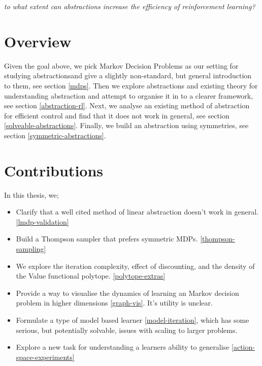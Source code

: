 \begin{displayquote}
\textit{to what extent can abstractions increase the efficiency of reinforcement learning?}
\end{displayquote}

\section{Overview}

Given the goal above, we pick Markov Decision Problems as our setting for studying abstractions\footnotemark[43] and give a slightly non-standard, but general introduction to them, see section \ref{mdps}.
Then we explore abstractions and existing theory for understanding abstraction and attempt to organise it in to a clearer framework, see section \ref{abstraction-rl}.
Next, we analyse an existing method of abstraction for efficient control and find that it does not work in general, see section \ref{solveable-abstractions}.
Finally, we build an abstraction using symmetries, see section \ref{symmetric-abstractions}.


\section{Contributions}

In this thesis, we;

\begin{itemize}
  \tightlist
  \item Clarify that a well cited method of linear abstraction doesn't work in general. \ref{lmdp-validation}
  \item Build a Thompson sampler that prefers symmetric MDPs. \ref{thompson-sampling}
  \item We explore the iteration complexity, effect of discounting, and the density of the Value functional polytope. \ref{polytope-extras}
  \item Provide a way to visualise the dynamics of learning an Markov decision problem in higher dimensions \ref{graph-vis}. It's utility is unclear.
  \item Formulate a type of model based learner \ref{model-iteration}, which has some serious, but potentially solvable, issues with scaling to larger problems.
  \item Explore a new task for understanding a learners ability to generalise \ref{action-space-experiments}
\end{itemize}
